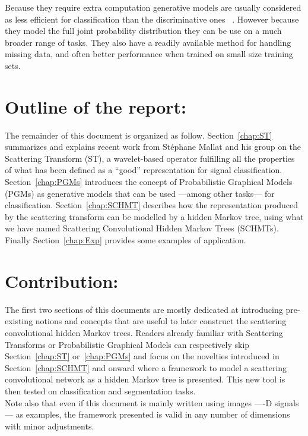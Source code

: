 \documentclass[a4paper,11pt]{report}
\begin{document}
		Because they require extra computation generative models are usually considered as less efficient for classification than the discriminative ones~\citep{ulusoy2005generative} \citep{jordan2002discriminative}. However because they model the full joint probability distribution they can be use on a much broader range of tasks. They also have a readily available method for handling missing data, and often better performance when trained on small size training sets.
		
	\section{Outline of the report:}
    \label{sec:Intro/Outline of the report}    
    
    The remainder of this document is organized as follow. Section~\ref{chap:ST} summarizes and explains recent work from St\'ephane Mallat and his group on the Scattering Transform (ST), a wavelet-based operator fulfilling all the properties of what has been defined as a ``good'' representation for signal classification. Section~\ref{chap:PGMs} introduces the concept of Probabilistic Graphical Models (PGMs) as generative models that can be used ---among other tasks--- for classification. Section~\ref{chap:SCHMT} describes how the representation produced by the scattering transform can be modelled by a hidden Markov tree, using what we have named Scattering Convolutional Hidden Markov Trees (SCHMTs). Finally Section~\ref{chap:Exp} provides some examples of application.
        
	\section{Contribution:}
    \label{sec:Intro/Contrib}    
    
    The first two sections of this documents are mostly dedicated at introducing pre-existing notions and concepts that are useful to later construct the scattering convolutional hidden Markov trees. Readers already familiar with Scattering Transforms or Probabilistic Graphical Models can respectively skip Section~\ref{chap:ST} or~\ref{chap:PGMs} and focus on the novelties introduced in Section~\ref{chap:SCHMT} and onward where a framework to model a scattering convolutional network as a hidden Markov tree is presented. This new tool is then tested on classification and segmentation tasks.\\
    
    Note also that even if this document is mainly written using images ----D signals--- as examples, the framework presented is valid in any number of dimensions with minor adjustments.
\end{document}
